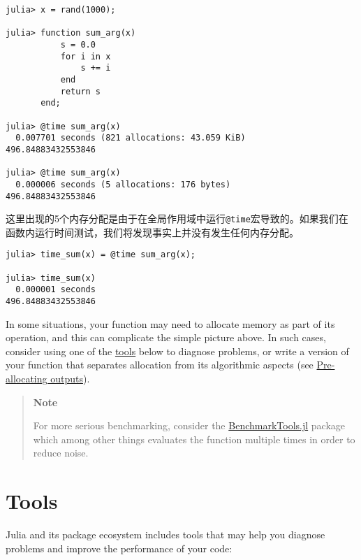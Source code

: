 \begin{verbatim}
julia> x = rand(1000);

julia> function sum_arg(x)
           s = 0.0
           for i in x
               s += i
           end
           return s
       end;

julia> @time sum_arg(x)
  0.007701 seconds (821 allocations: 43.059 KiB)
496.84883432553846

julia> @time sum_arg(x)
  0.000006 seconds (5 allocations: 176 bytes)
496.84883432553846
\end{verbatim}



这里出现的5个内存分配是由于在全局作用域中运行\texttt{@time}宏导致的。如果我们在函数内运行时间测试，我们将发现事实上并没有发生任何内存分配。




\begin{verbatim}
julia> time_sum(x) = @time sum_arg(x);

julia> time_sum(x)
  0.000001 seconds
496.84883432553846
\end{verbatim}



In some situations, your function may need to allocate memory as part of its operation, and this can complicate the simple picture above. In such cases, consider using one of the \hyperlink{11178925956438684264}{tools} below to diagnose problems, or write a version of your function that separates allocation from its algorithmic aspects (see \href{@ref}{Pre-allocating outputs}).



\begin{quote}
\textbf{Note}

For more serious benchmarking, consider the \href{https://github.com/JuliaCI/BenchmarkTools.jl}{BenchmarkTools.jl} package which among other things evaluates the function multiple times in order to reduce noise.

\end{quote}


\hypertarget{14350444000650775715}{}


\section{Tools}



Julia and its package ecosystem includes tools that may help you diagnose problems and improve the performance of your code:



